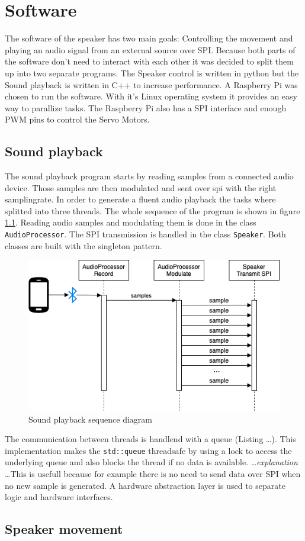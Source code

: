 \chapter{Software}

The software of the speaker has two main goals: Controlling the movement and playing an audio signal from an external source over SPI. Because both parts of the software don't need to interact with each other it was decided to split them up into two separate programs. The Speaker control is written in python but the Sound playback is written in C++ to increase performance.\p
%
A Raspberry Pi was chosen to run the software. With it's Linux operating system it provides an easy way to parallize tasks. The Raspberry Pi also has a SPI interface and enough PWM pins to control the Servo Motors.

\section{Sound playback}

The sound playback program starts by reading samples from a connected audio device. Those samples are then modulated and sent over spi with the right samplingrate. In order to generate a fluent audio playback the tasks where splitted into three threads. The whole sequence of the program is shown in figure \ref{fig:software:sound_sequence}.\p
Reading audio samples and modulating them is done in the class \lstinline{AudioProcessor}. The SPI transmission is handled in the class \lstinline{Speaker}. Both classes are built with the singleton pattern.
%
\begin{figure}
  \centering
  \includegraphics[height=\mediumheight]{src/assets/pictures/software/sequence_diagramm.png}
  \caption{Sound playback sequence diagram}\label{fig:software:sound_sequence}
\end{figure}
%
The communication between threads is handlend with a queue (Listing \dots). This implementation makes the \lstinline{std::queue} threadsafe by using a lock to access the underlying queue and also blocks the thread if no data is available. \dots \textit{explanation} \dots This is usefull because for example there is no need to send data over SPI when no new sample is generated.\p
%
A hardware abstraction layer is used to separate logic and hardware interfaces.





\section{Speaker movement}
